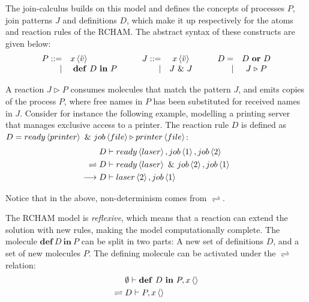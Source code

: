 The join-calculus builds on this model and defines the concepts of processes
$P$, join patterns $J$ and definitions $D$, which make it up respectively for
the atoms and reaction rules of the RCHAM. The abstract syntax of these
constructs are given below:
\begin{displaymath}
\begin{array}{rl}
  P ::=& \atm x < \tilde v > \\
 |& \defJ D \inJ P
\end{array}\qquad
\begin{array}{rc}
  J ::=& \atm x < \tilde v > \\
 |& J \andJ J
\end{array}\qquad
\begin{array}{rc}
  D =& D \orJ D \\
 |& J \toJ{} P
\end{array}
\end{displaymath}

A reaction $J \triangleright P$ consumes molecules that match the pattern $J$,
and emits copies of the process $P$, where free names in $P$ has been
substituted for received names in $J$. Consider for instance the following
example, modelling a printing server that manages exclusive access to a printer.
The reaction rule $D$ is defined as $D = \atm ready<printer> ~\&~ \atm job<file>
\triangleright \atm printer<file>$:
\begin{align*}
  & D \vdash \atm ready<laser>, \atm job<1>, \atm job<2> \\
\rightleftharpoons{}& D \vdash \atm ready<laser> ~\&~ \atm job<2>, \atm job<1> \\
\longrightarrow{}& D \vdash \atm laser<2>, \atm job<1>
\end{align*}

Notice that in the above, non-determinism comes from $\rightleftharpoons$.

The RCHAM model is \emph{reflexive}, which means that a reaction can extend the
solution with new rules, making the model computationally complete. The molecule
$\mathbf{def}~D~\mathbf{in}~P$ can be split in two parts: A new set of
definitions $D$, and a set of new molecules $P$. The defining molecule can be
activated under the $\rightleftharpoons$ relation:
\begin{align*}
 & \emptyset \vdash \mathbf{def}~D~\mathbf{in}~P, \atm x<> \\
\rightleftharpoons{}& D \vdash P, \atm x<>
\end{align*}


